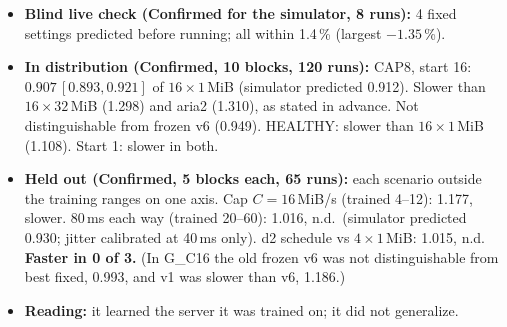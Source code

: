 \begin{itemize}
\item \textbf{Blind live check (Confirmed for the simulator, 8 runs):} 4 fixed settings predicted before running; all within 1.4\,\% (largest $-1.35$\,\%).
\item \textbf{In distribution (Confirmed, 10 blocks, 120 runs):} CAP8, start 16: $\mathbf{0.907\,[0.893, 0.921]}$ of $16\times1$\,MiB (simulator predicted 0.912). Slower than $16\times32$\,MiB (1.298) and aria2 (1.310), as stated in advance. Not distinguishable from frozen v6 (0.949). HEALTHY: slower than $16\times1$\,MiB (1.108). Start 1: slower in both.
\item \textbf{Held out (Confirmed, 5 blocks each, 65 runs):} each scenario outside the training ranges on one axis. Cap $C=16$\,MiB/s (trained 4--12): 1.177, slower. 80\,ms each way (trained 20--60): 1.016, n.d.\ (simulator predicted 0.930; jitter calibrated at 40\,ms only). d2 schedule vs $4\times1$\,MiB: 1.015, n.d. \textbf{Faster in 0 of 3.} (In G\_C16 the old frozen v6 was not distinguishable from best fixed, 0.993, and v1 was slower than v6, 1.186.)
\item \textbf{Reading:} it learned the server it was trained on; it did not generalize.
\end{itemize}

